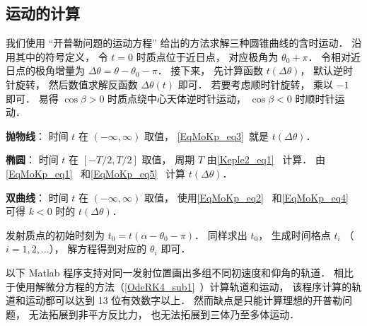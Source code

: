 \subsection{运动的计算}


我们使用 “开普勒问题的运动方程” 给出的方法求解三种圆锥曲线的含时运动． 沿用其中的符号定义， 令 $t=0$ 时质点位于近日点， 对应极角为 $\theta_0 + \pi$． 令相对近日点的极角增量为 $\Delta\theta = \theta - \theta_0 - \pi$． 接下来， 先计算函数 $t(\Delta\theta)$， 默认逆时针旋转， 然后数值求解反函数 $\Delta\theta(t)$ 即可． 若要考虑顺时针旋转， 乘以 $-1$ 即可． 易得 $\cos\beta > 0$ 时质点绕中心天体逆时针运动， $\cos\beta < 0$ 时顺时针运动．

\textbf{抛物线}： 时间 $t$ 在 $(-\infty,\infty)$ 取值， \autoref{EqMoKp_eq3}~就是 $t(\Delta\theta)$．

\textbf{椭圆}： 时间 $t$ 在 $[-T/2,T/2]$ 取值， 周期 $T$ 由\autoref{Keple2_eq1}~ 计算． 由\autoref{EqMoKp_eq1}~ 和\autoref{EqMoKp_eq5}~ 计算 $t(\Delta\theta)$．

\textbf{双曲线}： 时间 $t$ 在 $(-\infty,\infty)$ 取值， 使用\autoref{EqMoKp_eq2}~ 和\autoref{EqMoKp_eq4}~ 可得 $k<0$ 时的 $t(\Delta\theta)$．

发射质点的初始时刻为 $t_0 = t(\alpha - \theta_0 - \pi)$． 同样求出 $t_0$， 生成时间格点 $t_i$ （$i=1,2,\dots$）， 解方程得到对应的 $\theta_i$ 即可．

以下 Matlab 程序支持对同一发射位置画出多组不同初速度和仰角的轨道． 相比于使用解微分方程的方法（\autoref{OdeRK4_sub1}~）计算轨道和运动， 该程序计算的轨道和运动都可以达到 13 位有效数字以上． 然而缺点是只能计算理想的开普勒问题， 无法拓展到非平方反比力， 也无法拓展到三体乃至多体运动．

